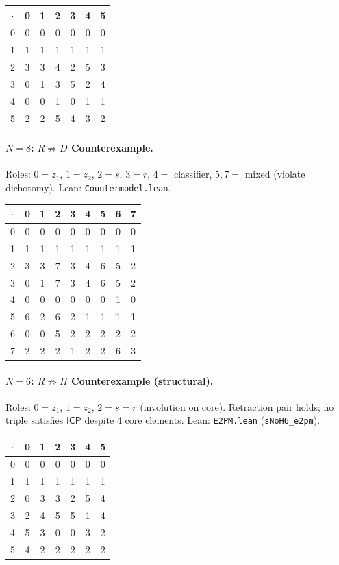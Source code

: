 \documentclass[a4paper,UKenglish,cleveref,autoref,thm-restate]{lipics-v2021}
\newcommand{\dotop}{\cdot}
\newcommand{\ICP}{\textsf{ICP}}
\begin{document}
\medskip
{\small
\begin{tabular}{c|cccccc}
$\dotop$ & 0 & 1 & 2 & 3 & 4 & 5 \\\hline
0 & 0 & 0 & 0 & 0 & 0 & 0 \\
1 & 1 & 1 & 1 & 1 & 1 & 1 \\
2 & 3 & 3 & 4 & 2 & 5 & 3 \\
3 & 0 & 1 & 3 & 5 & 2 & 4 \\
4 & 0 & 0 & 1 & 0 & 1 & 1 \\
5 & 2 & 2 & 5 & 4 & 3 & 2 \\
\end{tabular}}

\paragraph{$N\!=\!8$: $R \not\Rightarrow D$ Counterexample.}
Roles: $0 = z_1$, $1 = z_2$, $2 = s$, $3 = r$, $4 =$ classifier, $5, 7 =$ mixed (violate dichotomy). \quad Lean: \texttt{Countermodel.lean}.

\medskip
{\small
\begin{tabular}{c|cccccccc}
$\dotop$ & 0 & 1 & 2 & 3 & 4 & 5 & 6 & 7 \\\hline
0 & 0 & 0 & 0 & 0 & 0 & 0 & 0 & 0 \\
1 & 1 & 1 & 1 & 1 & 1 & 1 & 1 & 1 \\
2 & 3 & 3 & 7 & 3 & 4 & 6 & 5 & 2 \\
3 & 0 & 1 & 7 & 3 & 4 & 6 & 5 & 2 \\
4 & 0 & 0 & 0 & 0 & 0 & 0 & 1 & 0 \\
5 & 6 & 2 & 6 & 2 & 1 & 1 & 1 & 1 \\
6 & 0 & 0 & 5 & 2 & 2 & 2 & 2 & 2 \\
7 & 2 & 2 & 2 & 1 & 2 & 2 & 6 & 3 \\
\end{tabular}}

\paragraph{$N\!=\!6$: $R \not\Rightarrow H$ Counterexample (structural).}
Roles: $0 = z_1$, $1 = z_2$, $2 = s = r$ (involution on core). Retraction pair holds; no triple satisfies $\ICP$ despite 4 core elements. \quad Lean: \texttt{E2PM.lean} (\texttt{sNoH6\_e2pm}).

\medskip
{\small
\begin{tabular}{c|cccccc}
$\dotop$ & 0 & 1 & 2 & 3 & 4 & 5 \\\hline
0 & 0 & 0 & 0 & 0 & 0 & 0 \\
1 & 1 & 1 & 1 & 1 & 1 & 1 \\
2 & 0 & 3 & 3 & 2 & 5 & 4 \\
3 & 2 & 4 & 5 & 5 & 1 & 4 \\
4 & 5 & 3 & 0 & 0 & 3 & 2 \\
5 & 4 & 2 & 2 & 2 & 2 & 2 \\
\end{tabular}}
\end{document}

